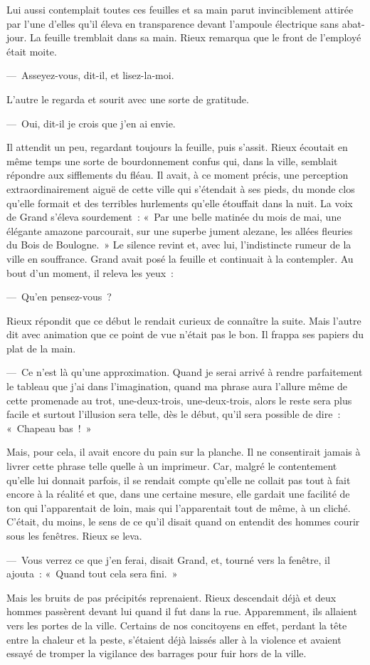 \documentclass[french,twoside]{book} %
\begin{document}
Lui aussi contemplait toutes ces feuilles et sa main parut invinciblement attirée par l’une d’elles qu’il éleva en transparence devant l’ampoule électrique sans abat-jour. La feuille tremblait dans sa main. Rieux remarqua que le front de l’employé était moite.\par
— Asseyez-vous, dit-il, et lisez-la-moi.\par
L’autre le regarda et sourit avec une sorte de gratitude.\par
— Oui, dit-il je crois que j’en ai envie.\par
Il attendit un peu, regardant toujours la feuille, puis s’assit. Rieux écoutait en même temps une sorte de bourdonnement confus qui, dans la ville, semblait répondre aux sifflements du fléau. Il avait, à ce moment précis, une perception extraordinairement aiguë de cette ville qui s’étendait à ses pieds, du monde clos qu’elle formait et des terribles hurlements qu’elle étouffait dans la nuit. La voix de Grand s’éleva sourdement : « Par une belle matinée du mois de mai, une élégante amazone parcourait, sur une superbe jument alezane, les allées fleuries du Bois de Boulogne. » Le silence revint et, avec lui, l’indistincte rumeur de la ville en souffrance. Grand avait posé la feuille et continuait à la contempler. Au bout d’un moment, il releva les yeux :\par
— Qu’en pensez-vous ?\par
Rieux répondit que ce début le rendait curieux de connaître la suite. Mais l’autre dit avec animation que ce point de vue n’était pas le bon. Il frappa ses papiers du plat de la main.\par
— Ce n’est là qu’une approximation. Quand je serai arrivé à rendre parfaitement le tableau que j’ai dans l’imagination, quand ma phrase aura l’allure même de cette promenade au trot, une-deux-trois, une-deux-trois, alors le reste sera plus facile et surtout l’illusion sera telle, dès le début, qu’il sera possible de dire : « Chapeau bas ! »\par
Mais, pour cela, il avait encore du pain sur la planche. Il ne consentirait jamais à livrer cette phrase telle quelle à un imprimeur. Car, malgré le contentement qu’elle lui donnait parfois, il se rendait compte qu’elle ne collait pas tout à fait encore à la réalité et que, dans une certaine mesure, elle gardait une facilité de ton qui l’apparentait de loin, mais qui l’apparentait tout de même, à un cliché. C’était, du moins, le sens de ce qu’il disait quand on entendit des hommes courir sous les fenêtres. Rieux se leva.\par
— Vous verrez ce que j’en ferai, disait Grand, et, tourné vers la fenêtre, il ajouta : « Quand tout cela sera fini. »\par
Mais les bruits de pas précipités reprenaient. Rieux descendait déjà et deux hommes passèrent devant lui quand il fut dans la rue. Apparemment, ils allaient vers les portes de la ville. Certains de nos concitoyens en effet, perdant la tête entre la chaleur et la peste, s’étaient déjà laissés aller à la violence et avaient essayé de tromper la vigilance des barrages pour fuir hors de la ville.
\end{document}
